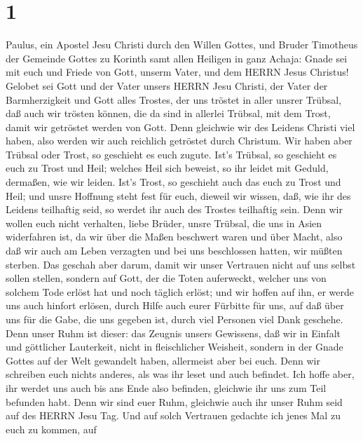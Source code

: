 \hypertarget{section}{%
\section{1}\label{section}}

 Paulus, ein Apostel Jesu Christi durch den Willen Gottes,
und Bruder Timotheus der Gemeinde Gottes zu Korinth samt allen Heiligen
in ganz Achaja:  Gnade sei mit euch und Friede von Gott,
unserm Vater, und dem HERRN Jesus Christus!  Gelobet sei
Gott und der Vater unsers HERRN Jesu Christi, der Vater der
Barmherzigkeit und Gott alles Trostes,  der uns tröstet in
aller unsrer Trübsal, daß auch wir trösten können, die da sind in
allerlei Trübsal, mit dem Trost, damit wir getröstet werden von Gott.
 Denn gleichwie wir des Leidens Christi viel haben, also
werden wir auch reichlich getröstet durch Christum.  Wir
haben aber Trübsal oder Trost, so geschieht es euch zugute. Ist's
Trübsal, so geschieht es euch zu Trost und Heil; welches Heil sich
beweist, so ihr leidet mit Geduld, dermaßen, wie wir leiden. Ist's
Trost, so geschieht auch das euch zu Trost und Heil;  und
unsre Hoffnung steht fest für euch, dieweil wir wissen, daß, wie ihr des
Leidens teilhaftig seid, so werdet ihr auch des Trostes teilhaftig sein.
 Denn wir wollen euch nicht verhalten, liebe Brüder, unsre
Trübsal, die uns in Asien widerfahren ist, da wir über die Maßen
beschwert waren und über Macht, also daß wir auch am Leben verzagten
 und bei uns beschlossen hatten, wir müßten sterben. Das
geschah aber darum, damit wir unser Vertrauen nicht auf uns selbst
sollen stellen, sondern auf Gott, der die Toten auferweckt,
 welcher uns von solchem Tode erlöst hat und noch täglich
erlöst; und wir hoffen auf ihn, er werde uns auch hinfort erlösen,
 durch Hilfe auch eurer Fürbitte für uns, auf daß über uns
für die Gabe, die uns gegeben ist, durch viel Personen viel Dank
geschehe.  Denn unser Ruhm ist dieser: das Zeugnis unsers
Gewissens, daß wir in Einfalt und göttlicher Lauterkeit, nicht in
fleischlicher Weisheit, sondern in der Gnade Gottes auf der Welt
gewandelt haben, allermeist aber bei euch.  Denn wir
schreiben euch nichts anderes, als was ihr leset und auch befindet. Ich
hoffe aber, ihr werdet uns auch bis ans Ende also befinden, gleichwie
ihr uns zum Teil befunden habt.  Denn wir sind euer Ruhm,
gleichwie auch ihr unser Ruhm seid auf des HERRN Jesu Tag. 
Und auf solch Vertrauen gedachte ich jenes Mal zu euch zu kommen, auf
